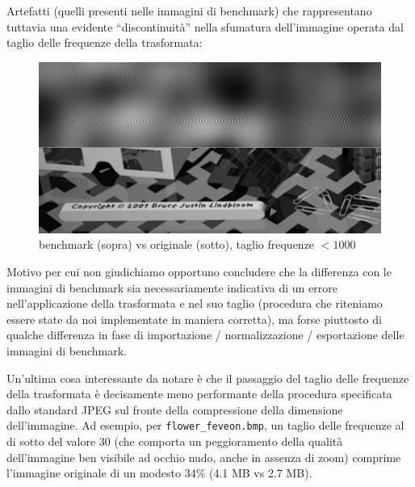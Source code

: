 \documentclass[11pt,a4paper]{scrartcl}
\begin{document}
Artefatti (quelli presenti nelle immagini di benchmark) che rappresentano tuttavia una evidente ``discontinuità'' nella sfumatura dell'immagine operata dal taglio delle frequenze della trasformata:

\begin{figure}[!ht]
\centering
\includegraphics[scale=0.6]{images/cfrbench1000}
\caption{benchmark (sopra) vs originale (sotto), taglio frequenze $< 1000$}
\end{figure}

Motivo per cui non giudichiamo opportuno concludere che la differenza con le immagini di benchmark sia necessariamente indicativa di un errore nell'applicazione della trasformata e nel suo taglio (procedura che riteniamo essere state da noi implementate in maniera corretta), ma forse piuttosto di qualche differenza in fase di importazione / normalizzazione / esportazione delle immagini di benchmark.

Un'ultima cosa interessante da notare è che il passaggio del taglio delle frequenze della trasformata è decisamente meno performante della procedura specificata dallo standard JPEG sul fronte della compressione della dimensione dell'immagine. Ad esempio, per \texttt{flower\_feveon.bmp}, un taglio delle frequenze al di sotto del valore 30 (che comporta un peggioramento della qualità dell'immagine ben visibile ad occhio nudo, anche in assenza di zoom) comprime l'immagine originale di un modesto 34\% (4.1 MB vs 2.7 MB).
\end{document}
